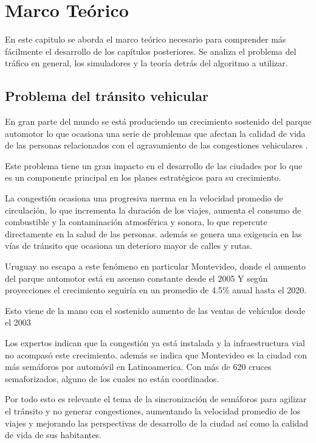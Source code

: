 \chapter{Marco Teórico}

 En este capitulo se aborda el marco teórico necesario para comprender más fácilmente el desarrollo de los capítulos posteriores. Se analiza el problema del tráfico en general, los simuladores y la teoría detrás del algoritmo a utilizar.

\section{Problema del tránsito vehicular}

En gran parte del mundo se está produciendo un crecimiento sostenido del parque automotor lo que ocasiona una serie de problemas que afectan la calidad de vida de las personas relacionados con el agravamiento de las congestiones vehiculares \citep{Cepal2003}.

Este problema tiene un gran impacto en el desarrollo de las ciudades por lo que es un componente principal en los planes estratégicos para su crecimiento.

La congestión ocasiona una progresiva merma en la velocidad promedio de circulación, lo que incrementa la duración de los viajes, aumenta el consumo de combustible y la contaminación atmosférica y sonora, lo que repercute directamente en la salud de las personas. 
además se genera una exigencia en las vías de tránsito que ocasiona un deterioro mayor de calles y rutas.

Uruguay no escapa a este fenómeno en particular Montevideo, donde el aumento del parque automotor está en ascenso constante desde el 2005 \citep{INE2014} 
Y según proyecciones el crecimiento seguiría en un promedio de 4.5\% anual hasta el 2020. \citep{BBVA2013}

Esto viene de la mano con el sostenido aumento de las ventas de vehículos  desde el 2003 \citep{Autoanuario2014}

Los expertos indican que la congestión ya está instalada y la infraestructura vial no acompasó este crecimiento. además se indica que Montevideo es la ciudad con más semáforos por automóvil en Latinoamerica. Con más de 620 cruces semaforizados, alguno de los cuales no están coordinados.\citep{Subrayado2013}

Por todo esto es relevante el tema de la sincronización de semáforos para agilizar el tránsito y no generar congestiones, aumentando la velocidad promedio de los viajes y mejorando las perspectivas de desarrollo de la ciudad así como la calidad de vida de sus habitantes.

